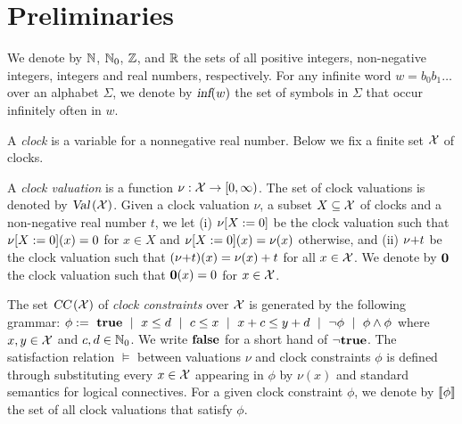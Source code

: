 \vspace{-1.5em}
\section{Preliminaries}
\vspace{-1em}

We denote by $\mathbb{N}$, $\mathbb{N}_0$, $\mathbb{Z}$, and $\mathbb{R}$ the sets of all positive
integers, non-negative integers, integers and real numbers, respectively.
For any infinite word $w=b_0b_1\dots$ over an alphabet $\Sigma$, we denote by $\mbox{\sl inf} ( w )$ the set of symbols %
in $\Sigma$ that occur infinitely often in $w$.

%
%
A \emph{clock} is a variable for a nonnegative real number. Below we fix a finite set $\mathcal{X}$ of clocks.

\smallskip {}
A \emph{clock valuation} is a function $\nu:\mathcal{X}\rightarrow [0,\infty)$. The set of clock valuations
is denoted by $\mbox{\sl Val}\left(\mathcal{X}\right)$.
Given a clock valuation $\nu$, a subset $X\subseteq\mathcal{X}$ of clocks and a non-negative real number $t$, we let (i) ${\nu}{\left[X:=0\right]}$ be the clock valuation such that ${\nu}{\left[X:=0\right]}(x)=0$ for $x\in X$ and ${\nu}{\left[X:=0\right]}(x)=\nu(x)$ otherwise, and (ii) ${\nu}{+}{t}$ be the clock valuation such that $({\nu}{+}{t})(x)=\nu(x)+t$ for all $x\in\mathcal{X}$.
We denote by $\mathbf{0}$ the clock valuation such that $\mathbf{0}(x)=0$ for $x\in\mathcal{X}$.

\smallskip {} The set $\mbox{\sl CC}\left(\mathcal{X}\right)$ of \emph{clock constraints}  over $\mathcal{X}$ is generated by the following grammar:
$
\phi:=~\mathbf{true}~\mid~x\le d~\mid ~c\le x~\mid~x+c\le y+d~\mid ~\neg\phi~\mid~\phi\wedge\phi
$
where $x,y\in\mathcal{X}$ and $c,d\in\mathbb{N}_0$.
We write $\mathbf{false}$ for a short hand of $\neg\mathbf{true}$.
The satisfaction relation $\models$ between valuations $\nu$ and clock constraints $\phi$ is defined through substituting every $x\in\mathcal{X}$ appearing in $\phi$ by $\nu(x)$ and standard semantics for logical connectives.
For a given clock constraint $\phi$, we denote by ${\llbracket}{\phi}{\rrbracket}$ the set of all clock valuations that satisfy $\phi$.

